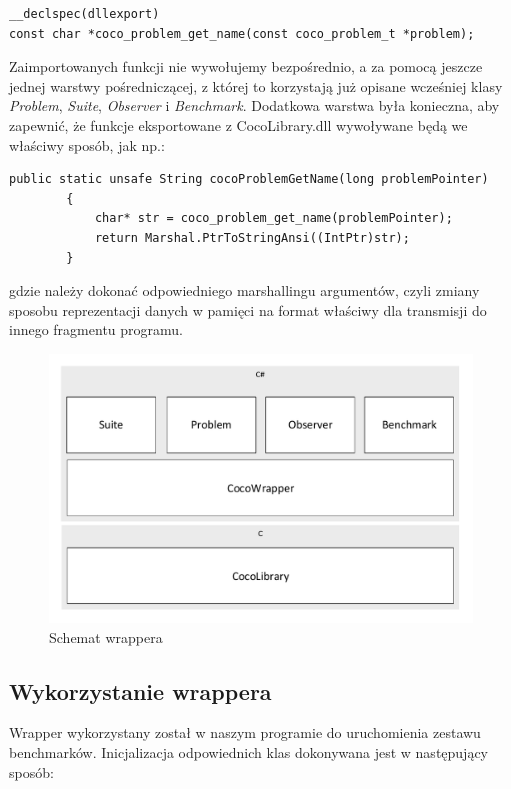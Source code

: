 \documentclass[12pt, twoside, openany, abstract=on]{report}
\theoremstyle{definition}
\begin{document}
\begin{lstlisting}[frame=single]
__declspec(dllexport) 
const char *coco_problem_get_name(const coco_problem_t *problem);
\end{lstlisting}

Zaimportowanych funkcji nie wywołujemy bezpośrednio, a za pomocą jeszcze jednej warstwy pośredniczącej, z której to korzystają już opisane wcześniej klasy \textit{Problem}, \textit{Suite}, \textit{Observer} i \textit{Benchmark}. Dodatkowa warstwa była konieczna, aby zapewnić, że funkcje eksportowane z CocoLibrary.dll wywoływane będą we właściwy sposób, jak np.:

\begin{lstlisting}[frame=single]
public static unsafe String cocoProblemGetName(long problemPointer)
        {
            char* str = coco_problem_get_name(problemPointer);
            return Marshal.PtrToStringAnsi((IntPtr)str);
        }
\end{lstlisting}

gdzie należy dokonać odpowiedniego marshallingu argumentów, czyli zmiany sposobu reprezentacji danych w pamięci na format właściwy dla transmisji do innego fragmentu programu.

\begin{figure}[H]
    \centering
    \includegraphics[scale=0.7]{wrapperDiagram.pdf} 
 \caption{Schemat wrappera}
\end{figure}

\subsection{Wykorzystanie wrappera}

Wrapper wykorzystany został w naszym programie do uruchomienia zestawu benchmarków. Inicjalizacja odpowiednich klas dokonywana jest w następujący sposób:
\end{document}
